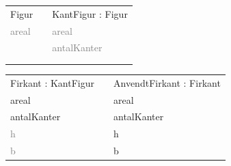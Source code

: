 \begin{frame}[fragile] 
\begin{table}[h]
\begin{tabular}{|l|l|l|}
 \cline{1-1} \cline{3-3} 
Figur          &  & KantFigur : Figur    \\ \cline{1-1} \cline{3-3} 
\textcolor{gray}{areal} &  & \textcolor{gray}{areal}       \\
               &  & \textcolor{gray}{antalKanter} \\
               &  &                      \\
               &  &                      \\ \cline{1-1} \cline{3-3} 
\end{tabular}
\end{table}
\begin{table}[h]
\begin{tabular}{|l|l|l|}
 \cline{1-1} \cline{3-3} 
Firkant : KantFigur &  & AnvendtFirkant : Firkant       \\ \cline{1-1} \cline{3-3} 
areal               &  & areal                \\
antalKanter         &  & antalKanter          \\
\textcolor{gray}{h}          &  & h                    \\
\textcolor{gray}{b}          &  & b                    \\ \cline{1-1} \cline{3-3} 
\end{tabular}
\end{table}
\end{frame}

